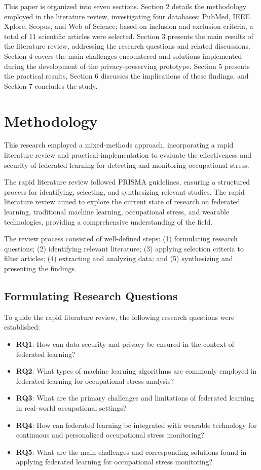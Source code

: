 \documentclass[12pt]{article}
\begin{document}
This paper is organized into seven sections. Section 2 details the methodology employed in the literature review, investigating four databases: PubMed, IEEE Xplore, Scopus, and Web of Science; based on inclusion and exclusion criteria, a total of 11 scientific articles were selected. Section 3 presents the main results of the literature review, addressing the research questions and related discussions. Section 4 covers the main challenges encountered and solutions implemented during the development of the privacy-preserving prototype. Section 5 presents the practical results, Section 6 discusses the implications of these findings, and Section 7 concludes the study.


\section{Methodology}

This research employed a mixed-methods approach, incorporating a rapid literature review and practical implementation to evaluate the effectiveness and security of federated learning for detecting and monitoring occupational stress. 

The rapid literature review followed PRISMA guidelines, ensuring a structured process for identifying, selecting, and synthesizing relevant studies. The rapid literature review aimed to explore the current state of research on federated learning, traditional machine learning, occupational stress, and wearable technologies, providing a comprehensive understanding of the field. 

The review process consisted of well-defined steps: (1) formulating research questions; (2) identifying relevant literature; (3) applying selection criteria to filter articles; (4) extracting and analyzing data; and (5) synthesizing and presenting the findings.


\subsection{Formulating Research Questions}

To guide the rapid literature review, the following research questions were established:
\begin{itemize}
    \item \textbf{RQ1}: How can data security and privacy be ensured in the context of federated learning?
    \item \textbf{RQ2}: What types of machine learning algorithms are commonly employed in federated learning for occupational stress analysis?
    \item \textbf{RQ3}: What are the primary challenges and limitations of federated learning in real-world occupational settings?
    \item \textbf{RQ4}: How can federated learning be integrated with wearable technology for continuous and personalized occupational stress monitoring?
    \item \textbf{RQ5}: What are the main challenges and corresponding solutions found in applying federated learning for occupational stress monitoring?
\end{itemize}
\end{document}
